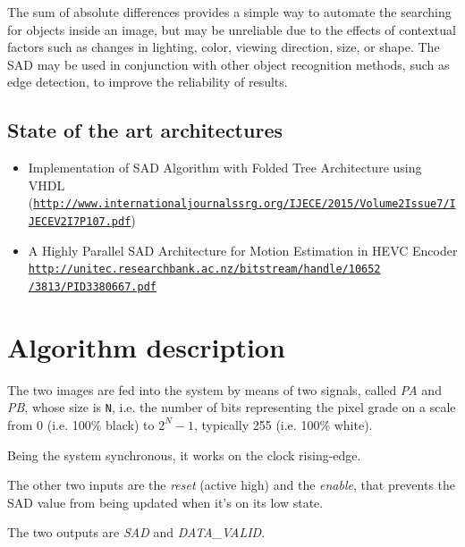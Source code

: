\documentclass[12pt, a4paper]{article}
\begin{document}
The sum of absolute differences provides a simple way to automate the searching for objects inside an image, but may be unreliable due to the effects of contextual factors such as changes in lighting, color, viewing direction, size, or shape. The SAD may be used in conjunction with other object recognition methods, such as edge detection, to improve the reliability of results.


\subsection{State of the art architectures}

\begin{itemize}
\item Implementation of SAD Algorithm with Folded Tree Architecture using VHDL\\
(\href{http://www.internationaljournalssrg.org/IJECE/2015/Volume2-Issue7/IJECE-V2I7P107.pdf}{\texttt{http://www.internationaljournalssrg.org/IJECE/2015/Volume2\-Issue7/IJECE\-V2I7P107.pdf}})

\item A Highly Parallel SAD Architecture for Motion
Estimation in HEVC Encoder \\
\href{http://unitec.researchbank.ac.nz/bitstream/handle/10652/3813/PID3380667.pdf}{\texttt{http://unitec.researchbank.ac.nz/bitstream/handle/10652\\/3813/PID3380667.pdf}}

\end{itemize}



\newpage
\section{Algorithm description}


The two images are fed into the system by means of two signals, called \textit{PA} and \textit{PB}, whose size is \texttt{N}, i.e. the number of bits representing the pixel grade on a scale from 0 (i.e. 100\% black) to $2^N-1$, typically 255 (i.e. 100\% white).

Being the system synchronous, it works on the clock rising-edge.


The other two inputs are the \textit{reset} (active high) and the \textit{enable}, that prevents the SAD value from being updated when it's on its low state.

The two outputs are \textit{SAD} and \textit{DATA\_VALID}. 
\end{document}
